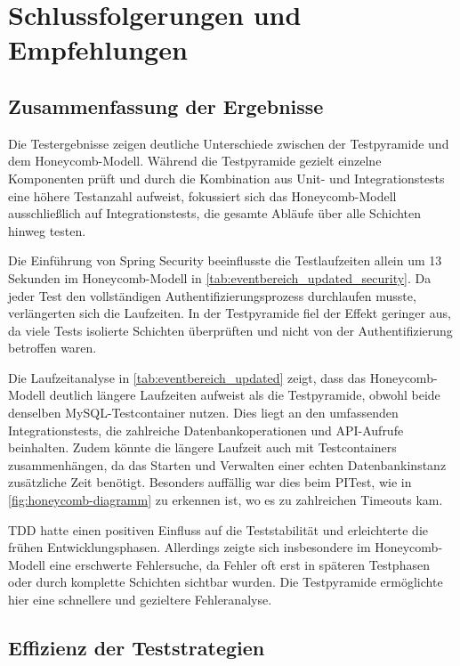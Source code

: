 \section{Schlussfolgerungen und Empfehlungen}

\subsection{Zusammenfassung der Ergebnisse}

Die Testergebnisse zeigen deutliche Unterschiede zwischen der Testpyramide und dem Honeycomb-Modell. Während die Testpyramide gezielt einzelne Komponenten prüft und durch die Kombination aus Unit- und Integrationstests eine höhere Testanzahl aufweist, fokussiert sich das Honeycomb-Modell ausschließlich auf Integrationstests, die gesamte Abläufe über alle Schichten hinweg testen.

Die Einführung von Spring Security beeinflusste die Testlaufzeiten allein um 13 Sekunden im Honeycomb-Modell in \autoref{tab:eventbereich_updated_security}. Da jeder Test den vollständigen Authentifizierungsprozess durchlaufen musste, verlängerten sich die Laufzeiten. In der Testpyramide fiel der Effekt geringer aus, da viele Tests isolierte Schichten überprüften und nicht von der Authentifizierung betroffen waren.

Die Laufzeitanalyse in \autoref{tab:eventbereich_updated} zeigt, dass das Honeycomb-Modell deutlich längere Laufzeiten aufweist als die Testpyramide, obwohl beide denselben MySQL-Testcontainer nutzen. Dies liegt an den umfassenden Integrationstests, die zahlreiche Datenbankoperationen und API-Aufrufe beinhalten. Zudem könnte die längere Laufzeit auch mit Testcontainers zusammenhängen, da das Starten und Verwalten einer echten Datenbankinstanz zusätzliche Zeit benötigt. Besonders auffällig war dies beim PITest, wie in \autoref{fig:honeycomb-diagramm} zu erkennen ist, wo es zu zahlreichen Timeouts kam.

TDD hatte einen positiven Einfluss auf die Teststabilität und erleichterte die frühen Entwicklungsphasen. Allerdings zeigte sich insbesondere im Honeycomb-Modell eine erschwerte Fehlersuche, da Fehler oft erst in späteren Testphasen oder durch komplette Schichten sichtbar wurden. Die Testpyramide ermöglichte hier eine schnellere und gezieltere Fehleranalyse.
\subsection{Effizienz der Teststrategien}

